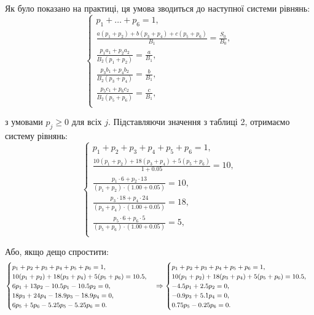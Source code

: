 \documentclass{test_template}
\begin{document}
Як було показано на практиці, ця умова зводиться до наступної системи рівнянь:
\begin{equation*}
    \begin{cases}
        p_1 + \dots + p_6 = 1, \\
        \frac{a(p_1+p_2)+b(p_3+p_4)+c(p_5+p_6)}{B_1} = \frac{S_0}{B_0}, \\
        \frac{p_1a_1 + p_2a_2}{B_2(p_1+p_2)} = \frac{a}{B_1}, \\
        \frac{p_3b_1 + p_4b_2}{B_2(p_3+p_4)} = \frac{b}{B_1}, \\
        \frac{p_5c_1 + p_6c_2}{B_2(p_5+p_6)} = \frac{c}{B_1}, \\
    \end{cases}
\end{equation*}

з умовами $p_j \geq 0$ для всіх $j$. Підставляючи значення з таблиці 2, отримаємо
систему рівнянь:
\begin{equation*}
    \begin{cases}
        p_1 + p_2 + p_3 + p_4 + p_5 + p_6 = 1, \\
        \frac{10(p_1+p_2)+18(p_3+p_4)+5(p_5+p_6)}{1+0.05} = 10, \\
        \frac{p_1\cdot 6 + p_2\cdot 13}{(p_1+p_2)\cdot (1.00+0.05)} = 10, \\
        \frac{p_3\cdot 18 + p_4\cdot 24}{(p_3+p_4)\cdot (1.00+0.05)} = 18, \\
        \frac{p_5\cdot 6 + p_6\cdot 5}{(p_5+p_6)\cdot (1.00+0.05)} = 5, \\
    \end{cases}
\end{equation*}

Або, якщо дещо спростити:
\begin{equation*}
    \small\begin{cases}
        p_1 + p_2 + p_3 + p_4 + p_5 + p_6 = 1, \\
        10(p_1+p_2)+18(p_3+p_4)+5(p_5+p_6) = 10.5, \\
        6p_1 + 13p_2 - 10.5p_1 - 10.5p_2 = 0, \\
        18p_3 + 24p_4 - 18.9p_3 - 18.9p_4 = 0, \\
        6p_5 + 5p_6 - 5.25p_5 - 5.25p_6 = 0. \\
    \end{cases} \Rightarrow \begin{cases}
        p_1 + p_2 + p_3 + p_4 + p_5 + p_6 = 1, \\
        10(p_1+p_2)+18(p_3+p_4)+5(p_5+p_6) = 10.5, \\
        -4.5p_1 + 2.5p_2 = 0, \\
        -0.9p_3 + 5.1p_4 = 0, \\
        0.75p_5 - 0.25p_6 = 0.
    \end{cases}
\end{equation*}
\end{document}
